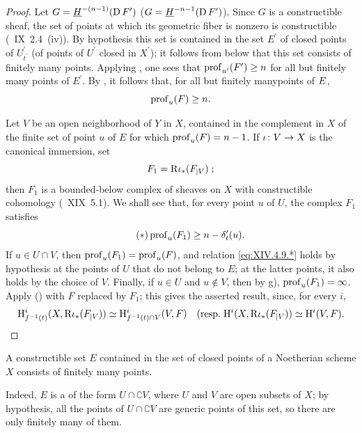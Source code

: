 \begin{proof}
Let $G=\underline{H}^{-(n-1)}(\D F^{\prime})$ (\resp $G=\underline{H}^{-n-1}(\D F^{\prime})$). Since $G$ is a constructible sheaf, the set of points at which its geometric fiber is nonzero is constructible (~IX~2.4~\textup{(iv)}). By hypothesis this set is contained in the set $E^{\prime}$ of closed points of $U_{t^{\prime}}^{\prime}$ (\resp of points of $U^{\prime}$ closed in $X^{\prime}$); it follows from  below that this set consists of finitely many points. Applying , one sees that $\prof_{u^{\prime}}(F^{\prime})\geq n$ for all but finitely many points of $E^{\prime}$. By , it follows that, for all but finitely many\pageoriginale points of $E^{\sisi{\prime}{}}$,
$$
\prof_{u}(F)\geq n.
$$

Let $V$ be an open neighborhood of $Y$ in $X$, contained in the complement in $X$ of the finite set of point $u$ of $E$ for which $\prof_{u}(F)=n-1$. If $\sisi{i}{\iota}\colon V\to X$ is the canonical immersion, set
$$F_{1}=\R \sisi{i}{\iota}_{\ast}(\sisi{F{|V}}{F_{|V}})\;;$$
then $F_{1}$ is a bounded-below complex of sheaves on $X$ with constructible cohomology (~XIX~5.1). We shall see that, for every point $u$ of $U$, the complex $F_{1}$ satisfies
\begin{equation*} \label{eq:XIV.4.9.*} \tag{$*$}
\prof_{u}(F_{1})\geq n-\delta_{t}^{\prime}(u).
\end{equation*}
If $u\in U\cap V$, then $\prof_{u}(F_{1})=\prof_{u}(F)$, and relation \eqref{eq:XIV.4.9.*} holds by hypothesis at the points of $U$ that do not belong to $E$; at the latter points, it also holds by the choice of $V$. Finally, if $u\in U$ and $u\not\in V$, then by  g), $\prof_{u}(F_{1})=\infty$. Apply  (\resp {}) with $F$ replaced by $F_{1}$; this gives the asserted result, since, for every $i$,
$$
\H_{f^{-1}(t)}^{i}(X, \R \sisi{i}{\iota}_{\ast}(\sisi{F{|V}}{F_{|V}}))\simeq\H_{f^{-1}(t)\cap V}^{i}(V, F)\quad(\textrm{\resp }\H^{i}(X, \R \sisi{i}{\iota}_{\ast}(\sisi{F{|V}}{F_{|V}}))\simeq\H^{i}(V, F).
$$
\skipqed
\end{proof}

\begin{sublemme} \label{XIV.4.9.1} A constructible set $E$ contained in the set of closed points of a Noetherian scheme $X$ consists of finitely many points\pageoriginale.
\end{sublemme}

Indeed, $E$ is a   of the form $U\cap\complement V$, where $U$ and $V$ are open subsets of $X$; by hypothesis, all the points of $U\cap\complement V$ are generic points of this set, so there are only finitely many of them.

